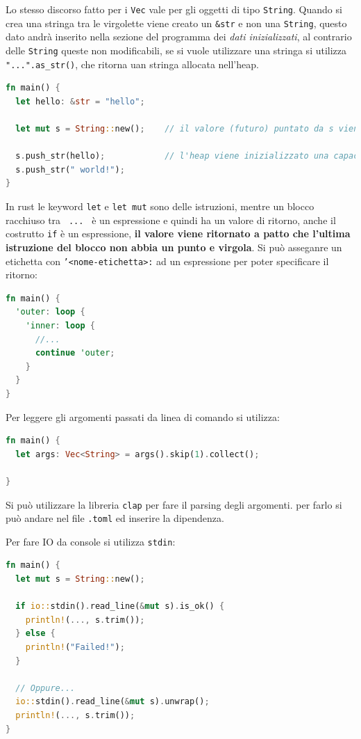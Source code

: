\documentclass[12pt]{article}
\begin{document}
Lo stesso discorso fatto per i \texttt{Vec} vale per gli oggetti di tipo \texttt{String}. Quando si crea una stringa tra le virgolette viene creato un \texttt{\&str} e non una \texttt{String}, questo dato andr\`a inserito nella sezione del programma dei \emph{dati inizializzati}, al contrario delle \texttt{String} queste non modificabili, se si vuole utilizzare una stringa si utilizza \texttt{"...".as\_str()}, che ritorna uan stringa allocata nell'heap.
\begin{lstlisting}[language=rust]
fn main() {
  let hello: &str = "hello";

  let mut s = String::new();    // il valore (futuro) puntato da s viene allocato nell'heap

  s.push_str(hello);            // l'heap viene inizializzato una capacita' ed un size uguale al size della stringa puntata da "hello"
  s.push_str(" world!");
}
\end{lstlisting}
In rust le keyword \texttt{let} e \texttt{let mut} sono delle istruzioni, mentre un blocco racchiuso tra \texttt{{ ... }} \`e un espressione e quindi ha un valore di ritorno, anche il costrutto \texttt{if} \`e un espressione, \textbf{il valore viene ritornato a patto che l'ultima istruzione del blocco non abbia un punto e virgola}. Si pu\`o asseganre un etichetta con \texttt{'<nome-etichetta>:} ad un espressione per poter specificare il ritorno:
\begin{lstlisting}[language=rust]
fn main() {
  'outer: loop {
    'inner: loop {
      //...
      continue 'outer;
    }
  }
}
\end{lstlisting}

Per leggere gli argomenti passati da linea di comando si utilizza:
\begin{lstlisting}[language=rust]
fn main() {
  let args: Vec<String> = args().skip(1).collect();

}
\end{lstlisting}
Si pu\`o utilizzare la libreria \texttt{clap} per fare il parsing degli argomenti. per farlo si pu\`o andare nel file \texttt{.toml} ed inserire la dipendenza.


Per fare IO da console si utilizza \texttt{stdin}:
\begin{lstlisting}[language=rust]
fn main() {
  let mut s = String::new();

  if io::stdin().read_line(&mut s).is_ok() {
    println!(..., s.trim());
  } else {
    println!("Failed!");
  }

  // Oppure...
  io::stdin().read_line(&mut s).unwrap();
  println!(..., s.trim());
}
\end{lstlisting}
\end{document}
